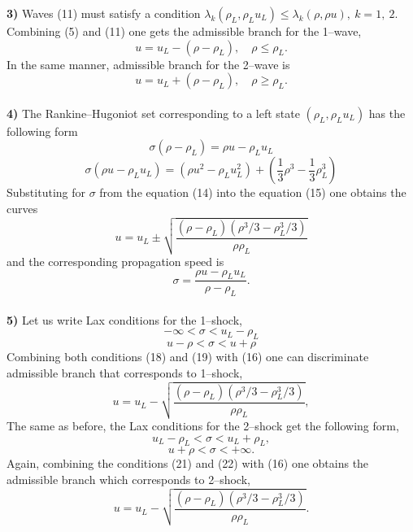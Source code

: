 \documentclass[a4paper, 10pt]{article}
\begin{document}
\textbf{3)} Waves (11) must satisfy a condition $ \lambda_k \left( \rho_L, \rho_L u_L \right) \leq \lambda_k \left(\rho, \rho u \right), \: k = 1, \: 2  $. Combining (5) and (11) one gets the admissible branch for the 1--wave,
\begin{equation}
u = u_{L} - \left( \rho - \rho_L \right) , \quad \rho \leq \rho_L.
\end{equation}
In the same manner, admissible branch for the 2--wave is
\begin{equation}
u = u_{L} + \left( \rho - \rho_L \right) , \quad \rho \geq \rho_L.
\end{equation}\\

\textbf{4)} The Rankine--Hugoniot set corresponding to a left state $ (\rho_L, \rho_L u_L) $ has the following form
\begin{equation}
\sigma \left( \rho - \rho_L \right) = \rho u - \rho_L u_L 
\end{equation}
\begin{equation}
\sigma \left( \rho u - \rho_L u_L \right) = \left( \rho u^{2} - \rho_L u_L^{2} \right) + \left( \frac{1}{3} \rho^{3} -  \frac{1}{3} \rho^{3}_L \right) 
\end{equation}
Substituting for $ \sigma $ from the equation (14) into the equation (15) one obtains the curves
\begin{equation}
u = u_L \pm \sqrt{\frac{\left( \rho - \rho_L \right) \left( \rho^{3}/3 - \rho_L^{3}/3 \right) }{\rho \rho_L}}
\end{equation}
and the corresponding propagation speed is
\begin{equation}
\sigma = \frac{\rho u - \rho_L u_L}{\rho - \rho_L}.
\end{equation}\\

\textbf{5)} Let us write Lax conditions for the 1--shock,
\begin{equation}
-\infty < \sigma < u_L - \rho_L
\end{equation}
\begin{equation}
u - \rho < \sigma < u + \rho
\end{equation}
Combining both conditions (18) and (19) with (16) one can discriminate admissible branch that corresponds to 1--shock,
\begin{equation}
u = u_L - \sqrt{\frac{\left( \rho - \rho_L \right) \left( \rho^{3}/3 - \rho_L^{3}/3 \right) }{\rho \rho_L}},
\end{equation}
The same as before, the Lax conditions for the 2--shock get the following form,
\begin{equation}
u_L - \rho_L < \sigma < u_L + \rho_L,
\end{equation}
\begin{equation}
u + \rho < \sigma < + \infty.
\end{equation}
Again, combining the conditions (21) and (22) with (16) one obtains the admissible branch which corresponds to 2--shock,
\begin{equation}
u = u_L - \sqrt{\frac{\left( \rho - \rho_L \right) \left( \rho^{3}/3 - \rho_L^{3}/3 \right) }{\rho \rho_L}}.
\end{equation}
\end{document}
